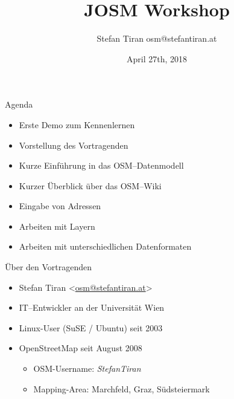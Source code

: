 \documentclass{beamer}
\title{JOSM Workshop}
\author{Stefan Tiran  osm@stefantiran.at}
\date{April 27th, 2018}
\begin{document}






\begin{frame}{Agenda}
  \begin{itemize}
    \item Erste Demo zum Kennenlernen
    \item Vorstellung des Vortragenden
    \item Kurze Einführung in das OSM--Datenmodell
    \item Kurzer Überblick über das OSM--Wiki
    \item Eingabe von Adressen
    \item Arbeiten mit Layern
    \item Arbeiten mit unterschiedlichen Datenformaten

  \end{itemize}
\end{frame}

\begin{frame}{Über den Vortragenden}

  \begin{itemize}
    \item Stefan Tiran \textless \href{mailto:osm@stefantiran.at}{osm@stefantiran.at}\textgreater
    \item IT--Entwickler an der Universität Wien
    \item Linux-User (SuSE / Ubuntu) seit 2003
    \item OpenStreetMap seit August 2008
    \begin{itemize}
      \item OSM-Username: \emph{StefanTiran}
      \item Mapping-Area: Marchfeld, Graz, Südsteiermark
    \end{itemize}
  \end{itemize}
\end{frame}
\end{document}
